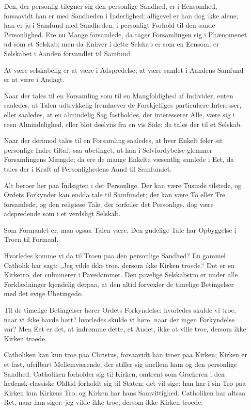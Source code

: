 \documentclass[12pt,a4paper]{book}
\newcommand{\apage}[1]{\marginnote{\footnotesize\textit{[#1]}}}
\begin{document}
Den, der personlig tilegner sig den personlige Sandhed, er i Eensomhed, forsaavidt han er med Sandheden i Inderlighed; alligevel er han dog ikke alene; han er jo i Samfund med Sandheden, i personligt Forhold til den sande Personlighed. Ere nu Mange forsamlede, da tager Forsamlingen sig i Phænomenet ud som et Selskab; men da Enhver i dette Selskab er som en Eensom, er Selskabet i Aanden forvandlet til Samfund.

At være selskabelig er at være i Adspredelse; at være samlet i Aandens Samfund er at være i Andagt.

Naar der tales til en Forsamling som til en Mangfoldighed af Individer, enten saaledes, at Talen udtrykkelig fremhæver de Forskjelliges particulære Interesser, eller
saaledes, at en almindelig Sag fastholdes, der interesserer Alle, \apage{51} være sig i reen Almindelighed, eller blot deelviis fra en vis Side: da tales der til et Selskab.

Naar der derimod tales til en Forsamling saaledes, at hver Enkelt føler sit personlige Indre tiltalt saa ubetinget, at han i Selvfordybelse glemmer Forsamlingens Mængde; da ere de mange Enkelte væsentlig samlede i Eet, da tales der i Kraft af Personlighedens Aand til Samfundet.

Alt beroer her paa Indsigten i det Personlige. Der kan være Tusinde tilstede, og Ordets Forkynder kan endda tale til Samfundet; der kan være To eller Tre forsamlede, og den religiøse Tale, der forfeiler det Personlige, dog være adspredende som i et verdsligt Selskab.

Som Formaalet er, maa ogsaa Talen være. Den gudelige Tale har Opbyggelse i Troen til Formaal.

Hvorledes komme vi da til Troen paa den personlige Sandhed? En gammel Catholik har sagt: „Jeg vilde ikke troe, dersom ikke Kirken troede.“ Det er en Kirketro, der culminerer i Pavedømmet. Den pavelige Selskabstro er under alle Forklædninger kjendelig derpaa, at den altid forvexler de timelige Betingelser med det evige Ubetingede.

Til de timelige Betingelser hører Ordets Forkyndelse: hvorledes skulde vi troe, naar vi ikke havde hørt? hvorledes skulde vi høre, naar der ingen Forkyndelse var? Men Eet er det, at indrømme dette, et Andet, ikke at ville troe, dersom ikke Kirken troede.

Catholiken kan kun troe paa Christus, forsaavidt han troer paa Kirken; Kirken er et fast, ufeilbart Mellemværende, der stiller sig imellem ham og den personlige Sandhed. Catholiken forholder sig til Kirken, omtrent som Grækeren i den hedensk-classiske Oldtid forholdt sig til Staten; det vil sige: han har i sin Tro paa Kirken kun Kirkens Tro, og Kirken har hans Samvittighed. Catholiken har altsaa Ret, naar han siger: jeg vilde ikke troe, dersom ikke Kirken troede.
 \apage{52}
\end{document}
